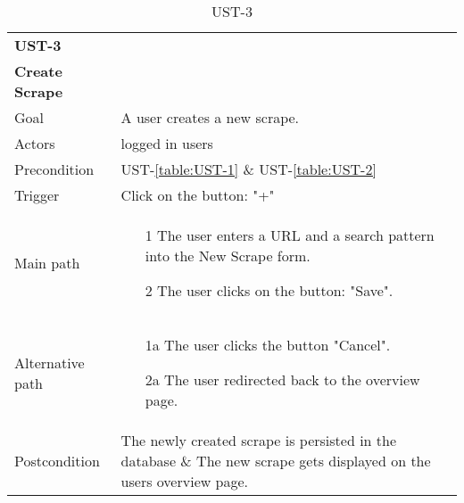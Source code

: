 \documentclass[titlepage, 12pt]{article}
\begin{document}
\begin{table}[H]
    \begin{center}

      \begin{tabular}{p{4cm}|p{10cm}}
        \textbf{UST-3}\\ \textbf{Create Scrape}                                            \\
        \hline
        Goal             & A user creates a new scrape.                  \\
        \hline
        Actors           & logged in users                                               \\
        \hline
        Precondition     & UST-\ref{table:UST-1} \& UST-\ref{table:UST-2}                \\
        \hline
        Trigger          & Click on the button: "+"                                   \\
        \hline
        Main path        &
        \begin{itemize}
          \item [1] The user enters a URL and a search pattern into the New Scrape form.
          \item [2] The user clicks on the button: "Save".
        \end{itemize}                                                         \\
        \hline
        Alternative path &
        \begin{itemize}
          \item [1a] The user clicks the button "Cancel".
          \item [2a] The user redirected back to the overview page.
        \end{itemize}                                                         \\
        \hline
        Postcondition    & The newly created scrape is persisted in the database \& The new scrape gets displayed on the users overview page. \\
      \end{tabular}

      \caption{UST-3}
      \label{table:UST-3}

    \end{center}
  \end{table}
\end{document}
